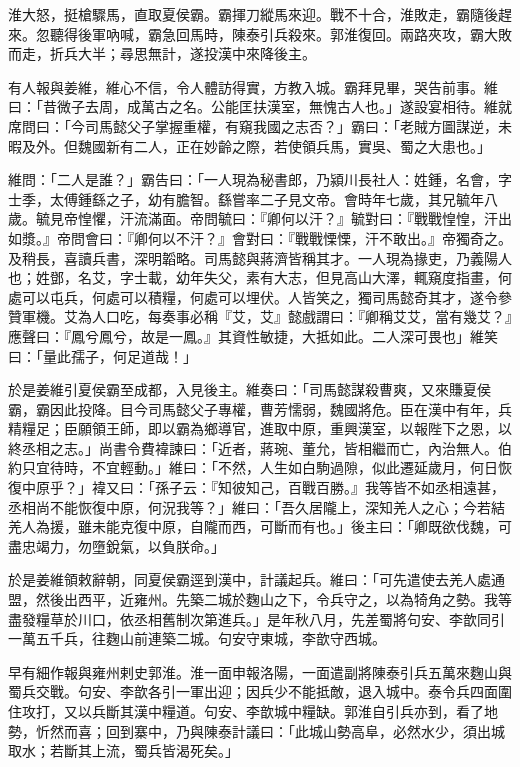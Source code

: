 淮大怒，挺槍驟馬，直取夏侯霸。霸揮刀縱馬來迎。戰不十合，淮敗走，霸隨後趕來。忽聽得後軍吶喊，霸急回馬時，陳泰引兵殺來。郭淮復回。兩路夾攻，霸大敗而走，折兵大半；尋思無計，遂投漢中來降後主。

有人報與姜維，維心不信，令人體訪得實，方教入城。霸拜見畢，哭告前事。維曰：「昔微子去周，成萬古之名。公能匡扶漢室，無愧古人也。」遂設宴相待。維就席問曰：「今司馬懿父子掌握重權，有窺我國之志否？」霸曰：「老賊方圖謀逆，未暇及外。但魏國新有二人，正在妙齡之際，若使領兵馬，實吳、蜀之大患也。」

維問：「二人是誰？」霸告曰：「一人現為秘書郎，乃潁川長社人：姓鍾，名會，字士季，太傅鍾繇之子，幼有膽智。繇嘗率二子見文帝。會時年七歲，其兄毓年八歲。毓見帝惶懼，汗流滿面。帝問毓曰：『卿何以汗？』毓對曰：『戰戰惶惶，汗出如漿。』帝問會曰：『卿何以不汗？』會對曰：『戰戰慄慄，汗不敢出。』帝獨奇之。及稍長，喜讀兵書，深明韜略。司馬懿與蔣濟皆稱其才。一人現為掾吏，乃義陽人也；姓鄧，名艾，字士載，幼年失父，素有大志，但見高山大澤，輒窺度指畫，何處可以屯兵，何處可以積糧，何處可以埋伏。人皆笑之，獨司馬懿奇其才，遂令參贊軍機。艾為人口吃，每奏事必稱『艾，艾』懿戲謂曰：『卿稱艾艾，當有幾艾？』應聲曰：『鳳兮鳳兮，故是一鳳。』其資性敏捷，大抵如此。二人深可畏也」維笑曰：「量此孺子，何足道哉！」

於是姜維引夏侯霸至成都，入見後主。維奏曰：「司馬懿謀殺曹爽，又來賺夏侯霸，霸因此投降。目今司馬懿父子專權，曹芳懦弱，魏國將危。臣在漢中有年，兵精糧足；臣願領王師，即以霸為鄉導官，進取中原，重興漢室，以報陛下之恩，以終丞相之志。」尚書令費褘諫曰：「近者，蔣琬、董允，皆相繼而亡，內治無人。伯約只宜待時，不宜輕動。」維曰：「不然，人生如白駒過隙，似此遷延歲月，何日恢復中原乎？」褘又曰：「孫子云：『知彼知己，百戰百勝。』我等皆不如丞相遠甚，丞相尚不能恢復中原，何況我等？」維曰：「吾久居隴上，深知羌人之心；今若結羌人為援，雖未能克復中原，自隴而西，可斷而有也。」後主曰：「卿既欲伐魏，可盡忠竭力，勿墮銳氣，以負朕命。」

於是姜維領敕辭朝，同夏侯霸逕到漢中，計議起兵。維曰：「可先遣使去羌人處通盟，然後出西平，近雍州。先築二城於麴山之下，令兵守之，以為犄角之勢。我等盡發糧草於川口，依丞相舊制次第進兵。」是年秋八月，先差蜀將句安、李歆同引一萬五千兵，往麴山前連築二城。句安守東城，李歆守西城。

早有細作報與雍州剌史郭淮。淮一面申報洛陽，一面遣副將陳泰引兵五萬來麴山與蜀兵交戰。句安、李歆各引一軍出迎；因兵少不能抵敵，退入城中。泰令兵四面圍住攻打，又以兵斷其漢中糧道。句安、李歆城中糧缺。郭淮自引兵亦到，看了地勢，忻然而喜；回到寨中，乃與陳泰計議曰：「此城山勢高阜，必然水少，須出城取水；若斷其上流，蜀兵皆渴死矣。」

